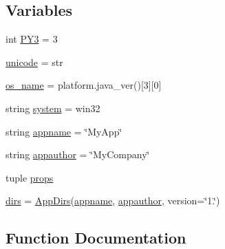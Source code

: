 \subsection*{Variables}
\begin{DoxyCompactItemize}
\item 
int \hyperlink{namespacepkg__resources_1_1__vendor_1_1appdirs_ae53ee26a526cb55b729ca8c0ec0859d7}{P\+Y3} = 3
\item 
\hyperlink{namespacepkg__resources_1_1__vendor_1_1appdirs_a3414b2343a3f9dd80c1b36f318c1814b}{unicode} = str
\item 
\hyperlink{namespacepkg__resources_1_1__vendor_1_1appdirs_ab9d5710e6ab8c40420e3f936809374ae}{os\+\_\+name} = platform.\+java\+\_\+ver()\mbox{[}3\mbox{]}\mbox{[}0\mbox{]}
\item 
string \hyperlink{namespacepkg__resources_1_1__vendor_1_1appdirs_aa7c79cebdf72f53f7c2c8c1bbd12a1fb}{system} = \textquotesingle{}win32\textquotesingle{}
\item 
string \hyperlink{namespacepkg__resources_1_1__vendor_1_1appdirs_a28612b51282dfcbcae04f6f4e4891d64}{appname} = \char`\"{}My\+App\char`\"{}
\item 
string \hyperlink{namespacepkg__resources_1_1__vendor_1_1appdirs_a59d40ca8fd52cbf79588efb87fbc4f1e}{appauthor} = \char`\"{}My\+Company\char`\"{}
\item 
tuple \hyperlink{namespacepkg__resources_1_1__vendor_1_1appdirs_a34a7869abb2f81d4a510493cbf7ef48a}{props}
\item 
\hyperlink{namespacepkg__resources_1_1__vendor_1_1appdirs_ab0933b9e5527360f72941b5191b9e17e}{dirs} = \hyperlink{classpkg__resources_1_1__vendor_1_1appdirs_1_1_app_dirs}{App\+Dirs}(\hyperlink{namespacepkg__resources_1_1__vendor_1_1appdirs_a28612b51282dfcbcae04f6f4e4891d64}{appname}, \hyperlink{namespacepkg__resources_1_1__vendor_1_1appdirs_a59d40ca8fd52cbf79588efb87fbc4f1e}{appauthor}, version=\char`\"{}1.\char`\"{})
\end{DoxyCompactItemize}


\subsection{Function Documentation}
\mbox{\label{namespacepkg__resources_1_1__vendor_1_1appdirs_a99cc70bd4895bf161b501b38f35bde38}} 
